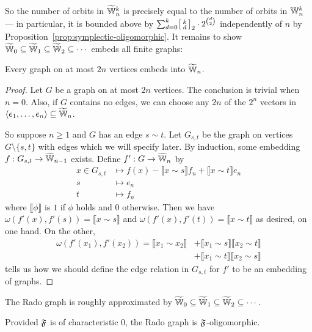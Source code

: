 So the number of orbits in $\widetilde {\mathbb{W}}_n^k$ is precisely equal to the number of orbits in $\mathbb{W}_n^k$
--- in particular, it is bounded above by $\sum_{d=0}^k \begin{bsmallmatrix}k \\ d\end{bsmallmatrix}_2 \cdot 2^{\binom{d}{2}}$ independently of $n$ by Proposition~\ref{prop:symplectic-oligomorphic}.
It remains to show $\widetilde {\mathbb{W}}_0 \subseteq \widetilde {\mathbb{W}}_1 \subseteq \widetilde {\mathbb{W}}_2 \subseteq \cdots$ embeds all finite graphs:

\begin{proposition}[{\cite[Theorem~8.11.2]{GR01}}]
    Every graph on at most $2n$ vertices embeds into $\widetilde {\mathbb{W}}_n$.
\end{proposition}
\begin{proof}
    Let $G$ be a graph on at most $2n$ vertices. 
    The conclusion is trivial when $n = 0$.
    Also, if $G$ contains no edges, we can choose any $2n$ of the $2^n$ vectors in 
    $\langle e_1, \ldots, e_n \rangle \subseteq \widetilde {\mathbb{W}}_n$.
    
    So suppose $n \geq 1$ and $G$ has an edge $s \sim t$.
    Let $G_{s,t}$ be the graph on vertices $G \setminus \{s, t\}$ with edges which we will specify later.
    By induction, some embedding $f : G_{s, t} \to \widetilde {\mathbb{W}}_{n-1}$ exists.
    Define $f' : G \to \widetilde {\mathbb{W}}_n$ by
    \begin{align*}
        x \in G_{s, t} &\mapsto f(x) - \llbracket x \sim s \rrbracket f_n + \llbracket x \sim t \rrbracket e_n \\
        s &\mapsto e_n \\
        t &\mapsto f_n
    \end{align*}
    where $\llbracket \phi \rrbracket$ is $1$ if $\phi$ holds and $0$ otherwise.
    Then we have $\omega(f'(x), f'(s)) = \llbracket x \sim s \rrbracket$ 
    and $\omega(f'(x), f'(t)) = \llbracket x \sim t \rrbracket$ as desired, on one hand.
    On the other,
    \begin{align*}
        \omega( f'(x_1), f'(x_2) ) 
        = \llbracket x_1 \sim x_2 \rrbracket 
        &+ \llbracket x_1 \sim s \rrbracket \llbracket x_2 \sim t \rrbracket \\
        &+ \llbracket x_1 \sim t \rrbracket \llbracket x_2 \sim s \rrbracket
    \end{align*}
    tells us how we should define the edge relation in $G_{s,t}$ for $f'$ to be an embedding of graphs.
\end{proof}

\begin{theorem}
    The Rado graph is roughly approximated by $\widetilde {\mathbb{W}}_0 \subseteq \widetilde {\mathbb{W}}_1 \subseteq \widetilde {\mathbb{W}}_2 \subseteq \cdots$.
\end{theorem}

\begin{corollary}
    Provided $\mathfrak{F}$ is of characteristic $0$, the Rado graph is $\mathfrak{F}$-oligomorphic.
\end{corollary}
